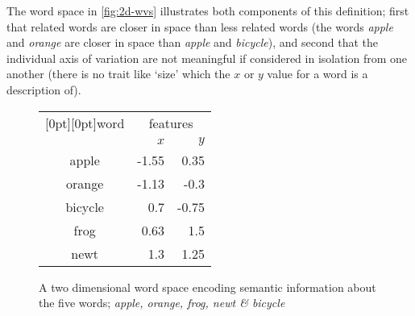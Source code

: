 \documentclass{ucetd}
\begin{document}
\begin{example*}\label{ex:2d-word-space}
\noindent
The word space in \autoref{fig:2d-wvs} illustrates both components of this definition; first that related words are closer in space than less related words (the words \textit{apple} and \textit{orange} are closer in space than \textit{apple} and \textit{bicycle}), and second that the individual axis of variation are not meaningful if considered in isolation from one another (there is no trait like `size'  which the $x$ or $y$ value for a word is a description of).
\begin{figure}[H]
  \centering
  \begin{minipage}[t]{.4\textwidth}
    \centering
    \vspace{0.4em}
  \caption{A two dimensional word space encoding semantic information about the five words; \emph{apple, orange, frog, newt \& bicycle}}\label{fig:2d-wvs}
  \end{minipage}\hspace{4em}
  \begin{minipage}[t]{.4\textwidth}
    \centering
    \vspace{0.5em}
    \begin{tabular}{c r r}
      \toprule
      \multicolumn{1}{c}{\raisebox{-9pt}[0pt][0pt]{word}\phantom{\quad}} & \multicolumn{2}{c}{features} \\
      \cmidrule(lr){2-3}
      \quad\quad & $x$ & $y$ \\
      \midrule
      apple   & -1.55 &  0.35 \\
      orange  & -1.13 & -0.3  \\
      bicycle &  0.7  & -0.75 \\
      frog    &  0.63 &  1.5  \\
      newt    &  1.3  &  1.25 \\
      \bottomrule
    \end{tabular}
    \vspace{0.5em}
    \label{tab:2d-wvs}
  \end{minipage}
\end{figure}
\vspace{0.0em}
\end{example*}
\end{document}
